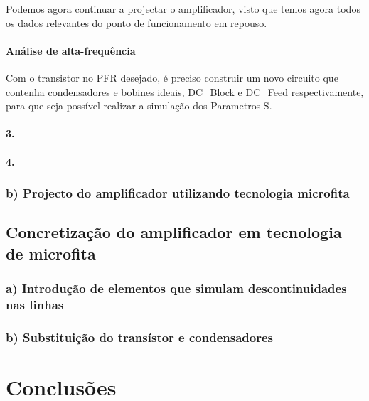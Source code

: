 \documentclass[11pt]{article}
\numberwithin{equation}{section}
\begin{document}
Podemos agora continuar a projectar o amplificador, visto que temos agora todos os dados relevantes do ponto de funcionamento em repouso.

\paragraph{Análise de alta-frequência}

Com o transistor no PFR desejado, é preciso construir um novo circuito que contenha condensadores e bobines ideais, DC\_Block e DC\_Feed respectivamente, para que seja possível realizar a simulação dos Parametros S.


\paragraph{3.}
\paragraph{4.}

\subsubsection{b) Projecto do amplificador utilizando tecnologia microfita}

\subsection{Concretização do amplificador em tecnologia de microfita}

\subsubsection{a) Introdução de elementos que simulam descontinuidades nas linhas}

\subsubsection{b) Substituição do transístor e condensadores}

\section{Conclusões}
\end{document}
